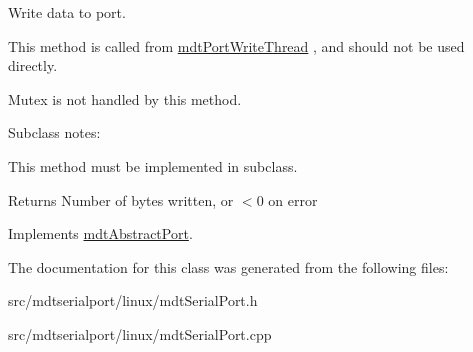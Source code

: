 Write data to port. 

This method is called from \hyperlink{classmdt_port_write_thread}{mdtPortWriteThread} , and should not be used directly.

Mutex is not handled by this method.

Subclass notes:\par
 This method must be implemented in subclass.\par


\begin{DoxyReturn}{Returns}
Number of bytes written, or $<$0 on error 
\end{DoxyReturn}


Implements \hyperlink{classmdt_abstract_port_a64d4802975a76474b9196c91f57a6d90}{mdtAbstractPort}.



The documentation for this class was generated from the following files:\begin{DoxyCompactItemize}
\item 
src/mdtserialport/linux/mdtSerialPort.h\item 
src/mdtserialport/linux/mdtSerialPort.cpp\end{DoxyCompactItemize}
